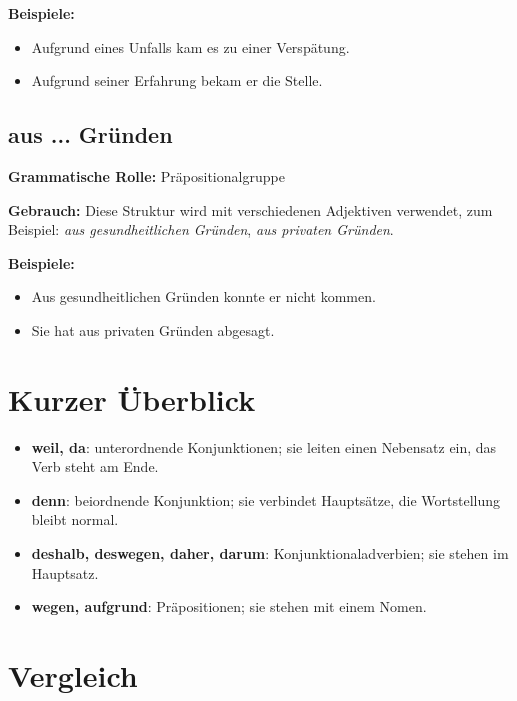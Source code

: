 \documentclass[a4paper]{article}
\begin{document}
            \textbf{Beispiele:}
            \begin{itemize}
                \item Aufgrund eines Unfalls kam es zu einer Verspätung.
                \item Aufgrund seiner Erfahrung bekam er die Stelle.
            \end{itemize}
        
        \subsection{aus ... Gründen}
            
            \textbf{Grammatische Rolle:} Präpositionalgruppe
            
            \textbf{Gebrauch:} Diese Struktur wird mit verschiedenen Adjektiven verwendet, zum Beispiel: \emph{aus gesundheitlichen Gründen}, \emph{aus privaten Gründen}.
            
            \textbf{Beispiele:}
            \begin{itemize}
                \item Aus gesundheitlichen Gründen konnte er nicht kommen.
                \item Sie hat aus privaten Gründen abgesagt.
            \end{itemize}
    
    
    \section{Kurzer Überblick}
        
        \begin{itemize}
            \item \textbf{weil, da}: unterordnende Konjunktionen; sie leiten einen Nebensatz ein, das Verb steht am Ende.
            \item \textbf{denn}: beiordnende Konjunktion; sie verbindet Hauptsätze, die Wortstellung bleibt normal.
            \item \textbf{deshalb, deswegen, daher, darum}: Konjunktionaladverbien; sie stehen im Hauptsatz.
            \item \textbf{wegen, aufgrund}: Präpositionen; sie stehen mit einem Nomen.
        \end{itemize}
    
    
    \section{Vergleich}
        
\end{document}
